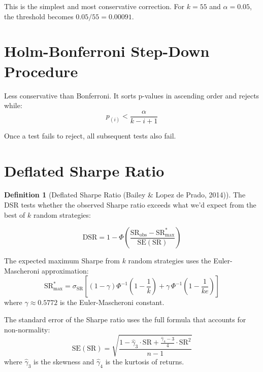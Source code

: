 \documentclass[12pt,a4paper]{report}
\theoremstyle{definition}
\newtheorem{definition}{Definition}[chapter]
\begin{document}
This is the simplest and most conservative correction. For $k = 55$ and $\alpha = 0.05$, the threshold becomes $0.05 / 55 = 0.00091$.

\section{Holm-Bonferroni Step-Down Procedure}
\label{sec:holm}

Less conservative than Bonferroni. It sorts p-values in ascending order and rejects while:
\begin{equation}
    p_{(i)} < \frac{\alpha}{k - i + 1}
\end{equation}

Once a test fails to reject, all subsequent tests also fail.

\section{Deflated Sharpe Ratio}
\label{sec:dsr}

\begin{definition}[Deflated Sharpe Ratio (Bailey \& Lopez de Prado, 2014)]
The DSR tests whether the observed Sharpe ratio exceeds what we'd expect from the best of $k$ random strategies:

\begin{equation}
    \text{DSR} = 1 - \Phi\!\left(\frac{\text{SR}_{\text{obs}} - \text{SR}_{\text{max}}^*}{\text{SE}(\text{SR})}\right)
    \label{eq:dsr}
\end{equation}
\end{definition}

The expected maximum Sharpe from $k$ random strategies uses the Euler-Mascheroni approximation:
\begin{equation}
    \text{SR}_{\text{max}}^* = \sigma_{\text{SR}} \left[(1 - \gamma)\Phi^{-1}\!\left(1 - \frac{1}{k}\right) + \gamma\,\Phi^{-1}\!\left(1 - \frac{1}{ke}\right)\right]
    \label{eq:expected-max-sharpe}
\end{equation}
where $\gamma \approx 0.5772$ is the Euler-Mascheroni constant.

The standard error of the Sharpe ratio uses the full formula that accounts for non-normality:
\begin{equation}
    \text{SE}(\text{SR}) = \sqrt{\frac{1 - \hat{\gamma}_3 \cdot \text{SR} + \frac{\hat{\gamma}_4 - 3}{4} \cdot \text{SR}^2}{n - 1}}
    \label{eq:se-sharpe}
\end{equation}
where $\hat{\gamma}_3$ is the skewness and $\hat{\gamma}_4$ is the kurtosis of returns.
\end{document}
